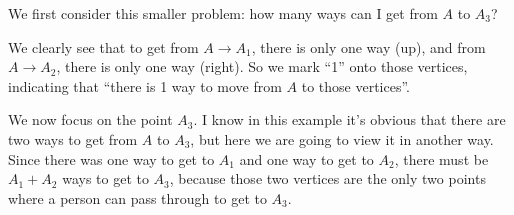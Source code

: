 We first consider this smaller problem: how many ways can I get from $A$ to $A_3$?
\begin{center}
\end{center}
We clearly see that to get from $A \rightarrow A_1$, there is only one way (up), and from $A \rightarrow A_2$, there is only one way (right). So we mark ``1'' onto those vertices, indicating that ``there is 1 way to move from $A$ to those vertices''.
\begin{center}
\end{center}
We now focus on the point $A_3$. I know in this example it's obvious that there are two ways to get from $A$ to $A_3$, but here we are going to view it in another way. Since there was one way to get to $A_1$ and one way to get to $A_2$, there must be $A_1+A_2$ ways to get to $A_3$, because those two vertices are the only two points where a person can pass through to get to $A_3$.
\begin{center}
\end{center}

